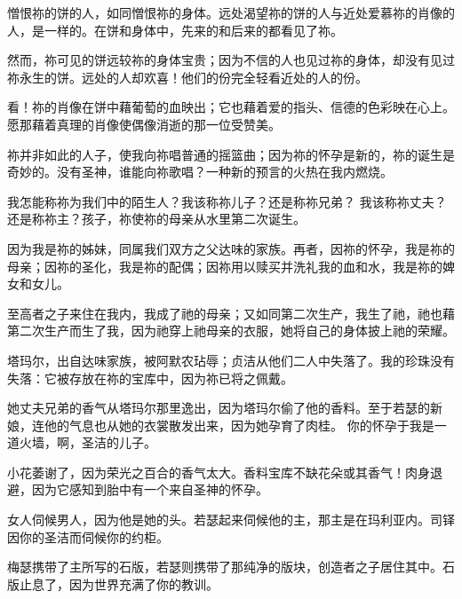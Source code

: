 憎恨祢的饼的人，如同憎恨祢的身体。远处渴望祢的饼的人与近处爱慕祢的肖像的人，是一样的。在饼和身体中，先来的和后来的都看见了祢。\par

然而，祢可见的饼远较祢的身体宝贵；因为不信的人也见过祢的身体，却没有见过祢永生的饼。远处的人却欢喜！他们的份完全轻看近处的人的份。\par

看！祢的肖像在饼中藉葡萄的血映出；它也藉着爱的指头、信德的色彩映在心上。愿那藉着真理的肖像使偶像消逝的那一位受赞美。\par

祢并非如此的人子，使我向祢唱普通的摇篮曲；因为祢的怀孕是新的，祢的诞生是奇妙的。没有圣神，谁能向祢歌唱？一种新的预言的火热在我内燃烧。\par

我怎能称祢为我们中的陌生人？我该称祢儿子？还是称祢兄弟？ 我该称祢丈夫？还是称祢主？孩子，祢使祢的母亲从水里第二次诞生。\par

因为我是祢的姊妹，同属我们双方之父达味的家族。再者，因祢的怀孕，我是祢的母亲；因祢的圣化，我是祢的配偶；因祢用以赎买并洗礼我的血和水，我是祢的婢女和女儿。\par

至高者之子来住在我内，我成了祂的母亲；又如同第二次生产，我生了祂，祂也藉第二次生产而生了我，因为祂穿上祂母亲的衣服，她将自己的身体披上祂的荣耀。\par

塔玛尔，出自达味家族，被阿默农玷辱；贞洁从他们二人中失落了。我的珍珠没有失落：它被存放在祢的宝库中，因为祢已将之佩戴。\par

她丈夫兄弟的香气从塔玛尔那里逸出，因为塔玛尔偷了他的香料。至于若瑟的新娘，连他的气息也从她的衣裳散发出来，因为她孕育了肉桂。 你的怀孕于我是一道火墙，啊，圣洁的儿子。\par

小花萎谢了，因为荣光之百合的香气太大。香料宝库不缺花朵或其香气！肉身退避，因为它感知到胎中有一个来自圣神的怀孕。\par

女人伺候男人，因为他是她的头。若瑟起来伺候他的主，那主是在玛利亚内。司铎因你的圣洁而伺候你的约柜。\par

梅瑟携带了主所写的石版，若瑟则携带了那纯净的版块，创造者之子居住其中。石版止息了，因为世界充满了你的教训。\par


